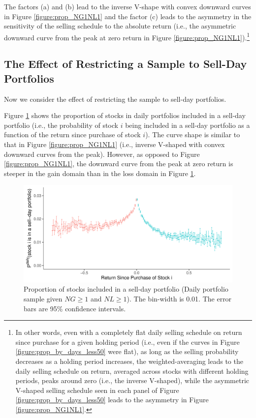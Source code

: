 \documentclass[11pt, a4paper]{article}
\begin{document}
The factors (a) and (b) lead to the inverse V-shape with convex downward curves in Figure \ref{figure:prop_NG1NL1} and the factor (c) leads to the asymmetry in the sensitivity of the selling schedule to the absolute return (i.e., the asymmetric downward curve from the peak at zero return in Figure \ref{figure:prop_NG1NL1}).\footnote{In other words, even with a completely flat daily selling schedule on return since purchase for a given holding period (i.e., even if the curves in Figure \ref{figure:prop_by_days_less50} were flat), as long as the selling probability decreases as a holding period increases, the weighted-averaging leads to the daily selling schedule on return, averaged across stocks with different holding periods, peaks around zero (i.e., the inverse V-shaped), while the asymmetric V-shaped selling schedule seen in each panel of Figure \ref{figure:prop_by_days_less50} leads to the asymmetry in Figure \ref{figure:prop_NG1NL1}.} 


\subsection{The Effect of Restricting a Sample to Sell-Day Portfolios}
\label{section:cond}

Now we consider the effect of restricting the sample to sell-day portfolios. 

Figure \ref{figure:prop_sell_day_NG1NL1} shows the proportion of stocks in daily portfolios included in a sell-day portfolio (i.e., the probability of stock $i$ being included in a sell-day portfolio as a function of the return since purchase of stock $i$). The curve shape is similar to that in Figure \ref{figure:prop_NG1NL1} (i.e., inverse V-shaped with convex downward curves from the peak). However, as opposed to Figure \ref{figure:prop_NG1NL1}, the downward curve from the peak at zero return is steeper in the gain domain than in the loss domain in Figure \ref{figure:prop_sell_day_NG1NL1}. 


\begin{figure}[H]
	\centering
	\includegraphics[width=0.8\columnwidth]{barc_port_sell_NG1_NL1.pdf}
	\caption{\small Proportion of stocks included in a sell-day portfolio (Daily portfolio sample given $NG\geq1$ and $NL\geq1$). The bin-width is 0.01. The error bars are 95\% confidence intervals.}
	\label{figure:prop_sell_day_NG1NL1}
\end{figure}
\end{document}
